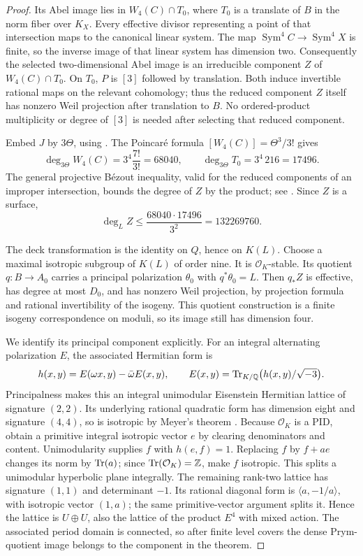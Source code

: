 \begin{proof}
Its Abel image lies in $W_4(C)\cap T_0$, where $T_0$ is a translate
of $B$ in the norm fiber over $K_X$. Every effective divisor representing
a point of that intersection maps to the canonical linear system.
The map $\operatorname{Sym}^4C\to\operatorname{Sym}^4X$ is finite,
so the inverse image of that linear system has dimension two.
Consequently the selected two-dimensional Abel image is an irreducible
component $Z$ of $W_4(C)\cap T_0$. On $T_0$, $P$ is $[3]$ followed by
translation. Both induce invertible rational maps on the relevant
cohomology; thus the reduced component $Z$ itself has nonzero Weil
projection after translation to $B$. No ordered-product multiplicity
or degree of $[3]$ is needed after selecting that reduced component.

Embed $J$ by $3\Theta$, using \cite[Theorem7.3, p.~11]{MilneAV}.
The Poincar\'e formula $[W_4(C)]=\Theta^3/3!$
\cite[p.~149, formulas (6)--(7)]{GriffithsPoincare1982} gives
\[
 \deg_{3\Theta}W_4(C)=3^4\frac{7!}{3!}=68040,
 \qquad \deg_{3\Theta}T_0=3^4\,216=17496.
\]
The general projective B\'ezout inequality, valid for the reduced
components of an improper intersection, bounds the degree of $Z$ by
the product; see \cite[Example~8.4.6, p.~146]{Fulton}.
Since $Z$ is a surface,
\[
 \deg_L Z\leq\frac{68040\cdot17496}{3^2}=132269760.
\]

The deck transformation is the identity on $Q$, hence on $K(L)$.
Choose a maximal isotropic subgroup of $K(L)$ of order nine. It is
$\mathcal O_K$-stable. Its quotient $q:B\to A_0$ carries a principal
polarization $\theta_0$ with $q^*\theta_0=L$. Then $q_*Z$ is effective,
has degree at most $D_0$, and has nonzero Weil projection, by projection
formula and rational invertibility of the isogeny. This quotient
construction is a finite isogeny correspondence on moduli, so its image
still has dimension four.

We identify its principal component explicitly. For an integral
alternating polarization $E$, the associated Hermitian form is
\[
 h(x,y)=E(\omega x,y)-\bar\omega E(x,y),\qquad
 E(x,y)=\operatorname{Tr}_{K/\mathbb Q}\bigl(h(x,y)/\sqrt{-3}\bigr).
\]
Principalness makes this an integral unimodular Eisenstein Hermitian
lattice of signature $(2,2)$. Its underlying rational quadratic form
has dimension eight and signature $(4,4)$, so is isotropic by Meyer's
theorem \cite[Corollary~3.3.4]{PetersSterk}. Because $\mathcal O_K$ is
a PID, obtain a primitive integral isotropic vector $e$ by clearing
denominators and content. Unimodularity supplies $f$ with $h(e,f)=1$.
Replacing $f$ by $f+ae$ changes its norm by $\operatorname{Tr}(a)$; since
$\operatorname{Tr}(\mathcal O_K)=\mathbb Z$, make $f$ isotropic. This splits a unimodular
hyperbolic plane integrally. The remaining rank-two lattice has
signature $(1,1)$ and determinant $-1$. Its rational diagonal form
is $\langle a,-1/a\rangle$, with isotropic vector $(1,a)$; the same
primitive-vector argument splits it. Hence the lattice is $U\oplus U$,
also the lattice of the product $E^4$ with mixed action. The associated
period domain is connected, so after finite level covers the dense
Prym-quotient image belongs to the component in the theorem.


\end{proof}
